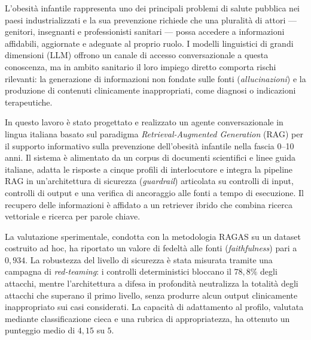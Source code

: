 
L'obesit\`a infantile rappresenta uno dei principali problemi di salute
pubblica nei paesi industrializzati e la sua prevenzione richiede che una
pluralit\`a di attori --- genitori, insegnanti e professionisti sanitari ---
possa accedere a informazioni affidabili, aggiornate e adeguate al proprio
ruolo. I modelli linguistici di grandi dimensioni (LLM) offrono un canale di
accesso conversazionale a questa conoscenza, ma in ambito sanitario il loro
impiego diretto comporta rischi rilevanti: la generazione di informazioni non
fondate sulle fonti (\emph{allucinazioni}) e la produzione di contenuti
clinicamente inappropriati, come diagnosi o indicazioni terapeutiche.

In questo lavoro \`e stato progettato e realizzato un agente conversazionale
in lingua italiana basato sul paradigma \emph{Retrieval-Augmented Generation}
(RAG) per il supporto informativo sulla prevenzione dell'obesit\`a infantile
nella fascia 0--10 anni. Il sistema \`e alimentato da un corpus di documenti
scientifici e linee guida italiane, adatta le risposte a cinque profili di
interlocutore e integra la pipeline RAG in un'architettura di sicurezza
(\emph{guardrail}) articolata su controlli di input, controlli di output e
una verifica di ancoraggio alle fonti a tempo di esecuzione. Il recupero delle
informazioni \`e affidato a un retriever ibrido che combina ricerca vettoriale
e ricerca per parole chiave.

La valutazione sperimentale, condotta con la metodologia RAGAS su un dataset
costruito ad hoc, ha riportato un valore di fedelt\`a alle fonti
(\emph{faithfulness}) pari a $0{,}934$. La robustezza del livello di sicurezza
\`e stata misurata tramite una campagna di \emph{red-teaming}: i controlli
deterministici bloccano il $78{,}8\%$ degli attacchi, mentre l'architettura a
difesa in profondit\`a neutralizza la totalit\`a degli attacchi che superano
il primo livello, senza produrre alcun output clinicamente inappropriato sui
casi considerati. La capacit\`a di adattamento al profilo, valutata mediante
classificazione cieca e una rubrica di appropriatezza, ha ottenuto un punteggio
medio di $4{,}15$ su $5$.
